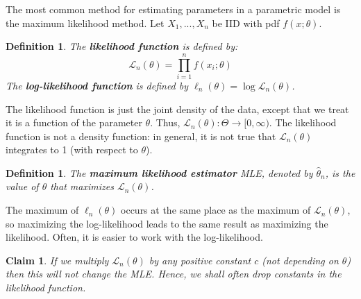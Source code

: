 \documentclass[twoside]{article}
\newtheorem{claim}[theorem]{Claim}
\newtheorem{definition}[theorem]{Definition}
\begin{document}
The most common method for estimating parameters in a parametric model is the maximum likelihood method. Let $X_1,...,X_n$ be IID with pdf $f(x; \theta)$.
\begin{definition}
The \textbf{likelihood function} is defined by:
\begin{equation*}
    \mathcal{L}_n(\theta) = \prod\limits_{i = 1}^{n}f(x_i; \theta)
\end{equation*}
The \textbf{log-likelihood function} is defined by $\ell_n(\theta) = \log\mathcal{L}_n(\theta)$.
\end{definition}
The likelihood function is just the joint density of the data, except that we treat it is a function of the parameter $\theta$. Thus,  $\mathcal{L}_n(\theta) : \Theta \to [0, \infty)$. The likelihood function is not a density function: in general, it is not true that $\mathcal{L}_n(\theta)$ integrates to 1 (with respect to $\theta$).
\begin{definition}
The \textbf{maximum likelihood estimator} MLE, denoted by $\hat{\theta}_n$, is the value of $\theta$ that maximizes $\mathcal{L}_n(\theta)$.
\end{definition}
The maximum of $\ell_n(\theta)$ occurs at the same place as the maximum of $\mathcal{L}_n(\theta)$, so maximizing the log-likelihood leads to the same result as maximizing the likelihood. Often, it is easier to work with the log-likelihood.
\begin{claim}
If we multiply $\mathcal{L}_n(\theta)$ by any positive constant $c$ (not depending on $\theta$) then this will not change the MLE. Hence, we shall often drop constants in the likelihood function.
\end{claim}
\end{document}
